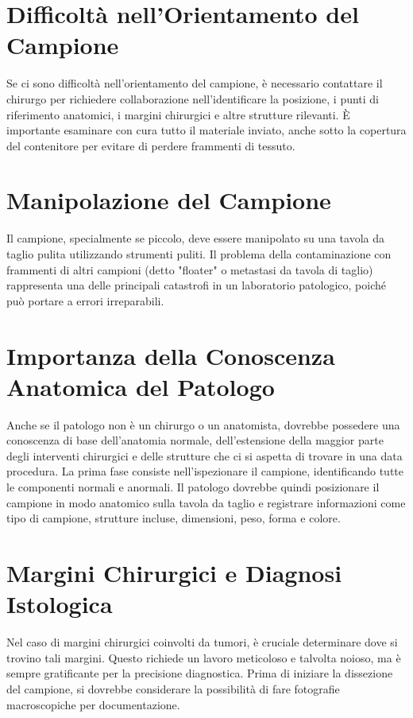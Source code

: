 \section{Difficoltà nell'Orientamento del Campione}
Se ci sono difficoltà nell'orientamento del campione, è necessario contattare il chirurgo per richiedere collaborazione nell'identificare la posizione, i punti di riferimento anatomici, i margini chirurgici e altre strutture rilevanti. È importante esaminare con cura tutto il materiale inviato, anche sotto la copertura del contenitore per evitare di perdere frammenti di tessuto.

\section{Manipolazione del Campione}
Il campione, specialmente se piccolo, deve essere manipolato su una tavola da taglio pulita utilizzando strumenti puliti. Il problema della contaminazione con frammenti di altri campioni (detto "floater" o metastasi da tavola di taglio) rappresenta una delle principali catastrofi in un laboratorio patologico, poiché può portare a errori irreparabili.

\section{Importanza della Conoscenza Anatomica del Patologo}
Anche se il patologo non è un chirurgo o un anatomista, dovrebbe possedere una conoscenza di base dell'anatomia normale, dell'estensione della maggior parte degli interventi chirurgici e delle strutture che ci si aspetta di trovare in una data procedura. La prima fase consiste nell'ispezionare il campione, identificando tutte le componenti normali e anormali. Il patologo dovrebbe quindi posizionare il campione in modo anatomico sulla tavola da taglio e registrare informazioni come tipo di campione, strutture incluse, dimensioni, peso, forma e colore.

\section{Margini Chirurgici e Diagnosi Istologica}
Nel caso di margini chirurgici coinvolti da tumori, è cruciale determinare dove si trovino tali margini. Questo richiede un lavoro meticoloso e talvolta noioso, ma è sempre gratificante per la precisione diagnostica. Prima di iniziare la dissezione del campione, si dovrebbe considerare la possibilità di fare fotografie macroscopiche per documentazione.

